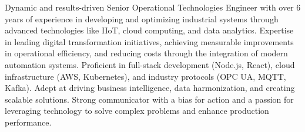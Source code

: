 

\begin{cvparagraph}

Dynamic and results-driven Senior Operational Technologies Engineer with over 6 years of experience in developing and optimizing industrial systems through advanced technologies like IIoT, cloud computing, and data analytics. Expertise in leading digital transformation initiatives, achieving measurable improvements in operational efficiency, and reducing costs through the integration of modern automation systems. Proficient in full-stack development (Node.js, React), cloud infrastructure (AWS, Kubernetes), and industry protocols (OPC UA, MQTT, Kafka). Adept at driving business intelligence, data harmonization, and creating scalable solutions. Strong communicator with a bias for action and a passion for leveraging technology to solve complex problems and enhance production performance.
\end{cvparagraph}
